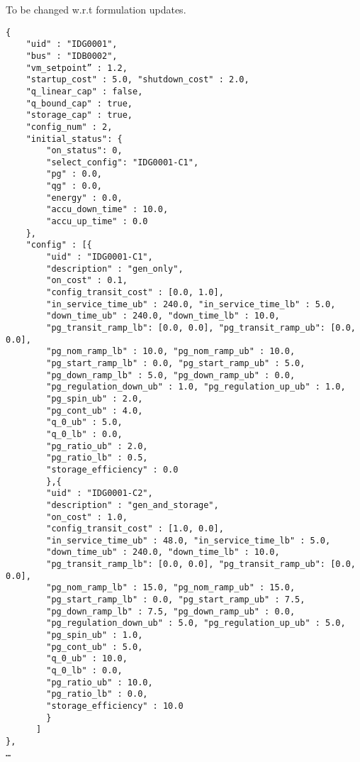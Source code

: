 \begin{todo}[]{}
To be changed w.r.t formulation updates. 
\end{todo}
\begin{verbatim}
{
    "uid" : "IDG0001",
    "bus" : "IDB0002",
    "vm_setpoint” : 1.2,
    "startup_cost" : 5.0, "shutdown_cost" : 2.0,
    "q_linear_cap" : false, 
    "q_bound_cap" : true, 
    "storage_cap" : true,
    "config_num" : 2,
    "initial_status": {
        "on_status": 0,
        "select_config": "IDG0001-C1",
        "pg" : 0.0,
        "qg" : 0.0,
        "energy" : 0.0,
        "accu_down_time" : 10.0,
        "accu_up_time" : 0.0
    },
    "config" : [{
        "uid" : "IDG0001-C1",
        "description" : "gen_only",
        "on_cost" : 0.1,
        "config_transit_cost" : [0.0, 1.0],
        "in_service_time_ub" : 240.0, "in_service_time_lb" : 5.0,
        "down_time_ub" : 240.0, "down_time_lb" : 10.0,
        "pg_transit_ramp_lb": [0.0, 0.0], "pg_transit_ramp_ub": [0.0, 0.0],
        "pg_nom_ramp_lb" : 10.0, "pg_nom_ramp_ub" : 10.0,
        "pg_start_ramp_lb" : 0.0, "pg_start_ramp_ub" : 5.0,
        "pg_down_ramp_lb" : 5.0, "pg_down_ramp_ub" : 0.0,
        "pg_regulation_down_ub" : 1.0, "pg_regulation_up_ub" : 1.0,
        "pg_spin_ub" : 2.0, 
        "pg_cont_ub" : 4.0, 
        "q_0_ub" : 5.0,
        "q_0_lb" : 0.0,
        "pg_ratio_ub" : 2.0,
        "pg_ratio_lb" : 0.5,
        "storage_efficiency" : 0.0
        },{
        "uid" : "IDG0001-C2",
        "description" : "gen_and_storage",
        "on_cost" : 1.0,
        "config_transit_cost" : [1.0, 0.0],
        "in_service_time_ub" : 48.0, "in_service_time_lb" : 5.0,
        "down_time_ub" : 240.0, "down_time_lb" : 10.0,
        "pg_transit_ramp_lb": [0.0, 0.0], "pg_transit_ramp_ub": [0.0, 0.0],
        "pg_nom_ramp_lb" : 15.0, "pg_nom_ramp_ub" : 15.0,
        "pg_start_ramp_lb" : 0.0, "pg_start_ramp_ub" : 7.5,
        "pg_down_ramp_lb" : 7.5, "pg_down_ramp_ub" : 0.0,
        "pg_regulation_down_ub" : 5.0, "pg_regulation_up_ub" : 5.0,
        "pg_spin_ub" : 1.0, 
        "pg_cont_ub" : 5.0, 
        "q_0_ub" : 10.0,
        "q_0_lb" : 0.0,
        "pg_ratio_ub" : 10.0,
        "pg_ratio_lb" : 0.0,
        "storage_efficiency" : 10.0
        }
      ]    
},
…     
\end{verbatim}

